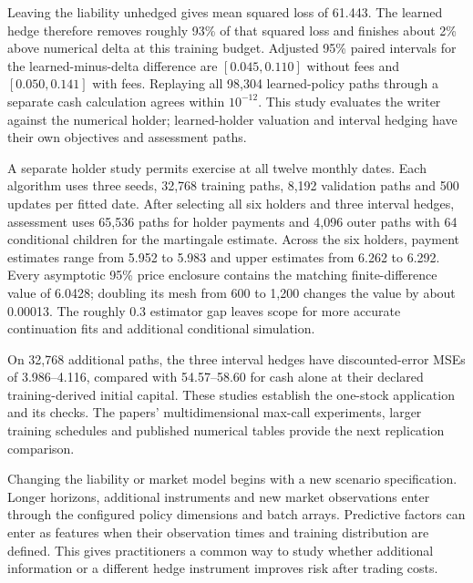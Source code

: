 \documentclass[8pt]{strategynet-journal}
\begin{document}
\begin{SNcolumns}
Leaving the liability unhedged gives mean squared loss of 61.443.
The learned hedge therefore removes roughly 93\% of that squared loss and
finishes about 2\% above numerical delta at this training budget. Adjusted
95\% paired intervals for the learned-minus-delta difference are
$[0.045,0.110]$ without fees and $[0.050,0.141]$ with fees. Replaying all
98,304 learned-policy paths through a separate cash calculation agrees
within $10^{-12}$. This study evaluates the writer against the numerical
holder; learned-holder valuation and interval hedging have their own
objectives and assessment paths.

A separate holder study permits exercise at all twelve monthly dates.
Each algorithm uses three seeds, 32,768 training paths, 8,192 validation
paths and 500 updates per fitted date. After selecting all six holders and
three interval hedges, assessment uses 65,536 paths for holder payments and
4,096 outer paths with 64 conditional children for the martingale estimate.
Across the six holders, payment estimates range from 5.952 to 5.983 and
upper estimates from 6.262 to 6.292. Every asymptotic 95\% price enclosure
contains the matching finite-difference value of 6.0428; doubling its mesh
from 600 to 1,200 changes the value by about 0.00013. The roughly 0.3
estimator gap leaves scope for more accurate continuation fits and additional
conditional simulation.

On 32,768 additional paths, the three interval hedges have discounted-error
MSEs of 3.986--4.116, compared with 54.57--58.60 for cash alone at their
declared training-derived initial capital. These studies establish the
one-stock application and its checks. The papers' multidimensional max-call
experiments, larger training schedules and published numerical tables provide
the next replication comparison.

Changing the liability or market model begins with a new scenario specification.
Longer horizons, additional instruments and new market observations enter through
the configured policy dimensions and batch arrays. Predictive factors can enter
as features when their observation times and training distribution are defined.
This gives practitioners a common way to study whether additional information
or a different hedge instrument improves risk after trading costs.
\end{SNcolumns}
\clearpage
\end{document}
